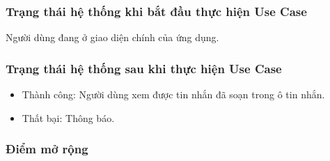 \subsubsection{Trạng thái hệ thống khi bắt đầu thực hiện Use Case}
Người dùng đang ở giao diện chính của ứng dụng.

\subsubsection{Trạng thái hệ thống sau khi thực hiện Use Case}
\begin{itemize}
  \item Thành công: Người dùng xem được tin nhắn đã soạn trong ô tin nhắn.
  \item Thất bại: Thông báo.
\end{itemize}

\subsubsection{Điểm mở rộng}